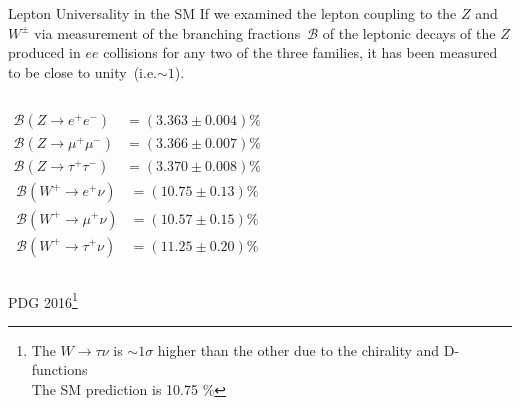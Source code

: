 \documentclass[9pt,usenames,dvipsnames]{beamer}
\begin{document}
\begin{frame}{Lepton Universality in the SM}
If we examined  the lepton coupling to the $Z$ and $ W^\pm$ via measurement of the branching fractions~$\mathcal B$ of the leptonic decays of the $Z$ produced in $ee$ collisions for any two of the three families, it has been measured to be close to unity~(i.e.$ \sim 1$).
	\begin{columns}[c]
		\begin{align*}
			\mathcal B (Z \to e^+ e^-) &= (3.363 \pm 0.004) \% \\
			\mathcal B (Z \to \mu^+ \mu^-)  &= (3.366 \pm 0.007) \% \\
			\mathcal B (Z \to \tau^+ \tau^-)  &= (3.370 \pm 0.008) \% 
		\end{align*}
		\begin{align*}
			\mathcal B (W^+ \to e^+ \nu)  &= (10.75 \pm 0.13) \% \\
			\mathcal B (W^+ \to \mu^+\nu )  &= (10.57 \pm 0.15)\% \\
			\mathcal B (W^+\to \tau^+ \nu)  &= (11.25\pm 0.20 )\% 
		\end{align*}	
	\end{columns}
	{\tiny PDG 2016}\footnote{ The $ W \to \tau \nu$ is  $\sim 1 \sigma$ higher than the other due to the chirality and D- functions \\ The SM prediction is 10.75 \%}
\end{frame}
\end{document}
